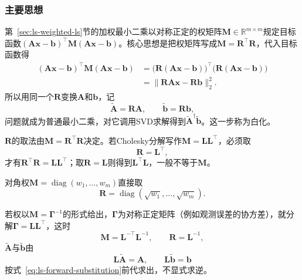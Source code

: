 \subsubsection{主要思想}
第~\ref{sec:ls-weighted-ls}节的加权最小二乘以对称正定的权矩阵$\bm M\in\mathbb R^{m\times m}$规定目标函数$(\bm A\bm x-\bm b)^\top\bm M(\bm A\bm x-\bm b)$。核心思想是把权矩阵写成$\bm M=\bm R^\top\bm R$，代入目标函数得
\begin{equation}
 \begin{aligned}
 (\bm A\bm x-\bm b)^\top\bm M(\bm A\bm x-\bm b)
 &=\bigl(\bm R(\bm A\bm x-\bm b)\bigr)^\top\bigl(\bm R(\bm A\bm x-\bm b)\bigr)\\
 &=\lVert\bm R\bm A\bm x-\bm R\bm b\rVert_2^2 .
 \end{aligned}
 \label{eq:ls-weighted-whitening}
\end{equation}
所以用同一个$\bm R$变换$\bm A$和$\bm b$，记
\begin{equation}
 \widetilde{\bm A}=\bm R\bm A,\qquad \widetilde{\bm b}=\bm R\bm b ,
 \label{eq:ls-weighted-transformed-data}
\end{equation}
问题就成为普通最小二乘，对它调用SVD求解得到$\widetilde{\bm A}^\dagger\widetilde{\bm b}$。这一步称为白化。

$\bm R$的取法由$\bm M=\bm R^\top\bm R$决定。若Cholesky分解写作$\bm M=\bm L\bm L^\top$，必须取
\begin{equation}
 \bm R=\bm L^\top ,
 \label{eq:ls-weighted-cholesky-factor}
\end{equation}
才有$\bm R^\top\bm R=\bm L\bm L^\top$；取$\bm R=\bm L$则得到$\bm L^\top\bm L$，一般不等于$\bm M$。

对角权$\bm M=\operatorname{diag}(w_1,\ldots,w_m)$直接取
\begin{equation}
 \bm R=\operatorname{diag}(\sqrt{w_1},\ldots,\sqrt{w_m}) .
 \label{eq:ls-weighted-diagonal-factor}
\end{equation}

若权以$\bm M=\bm\Gamma^{-1}$的形式给出，$\bm\Gamma$为对称正定矩阵（例如观测误差的协方差），就分解$\bm\Gamma=\bm L\bm L^\top$，这时
\begin{equation}
 \bm M=\bm L^{-\top}\bm L^{-1},\qquad \bm R=\bm L^{-1},
 \label{eq:ls-weighted-covariance-factor}
\end{equation}
$\widetilde{\bm A}$与$\widetilde{\bm b}$由
\begin{equation}
 \bm L\widetilde{\bm A}=\bm A,\qquad \bm L\widetilde{\bm b}=\bm b
 \label{eq:ls-weighted-covariance-solve}
\end{equation}
按式~\eqref{eq:ls-forward-substitution}前代求出，不显式求逆。

